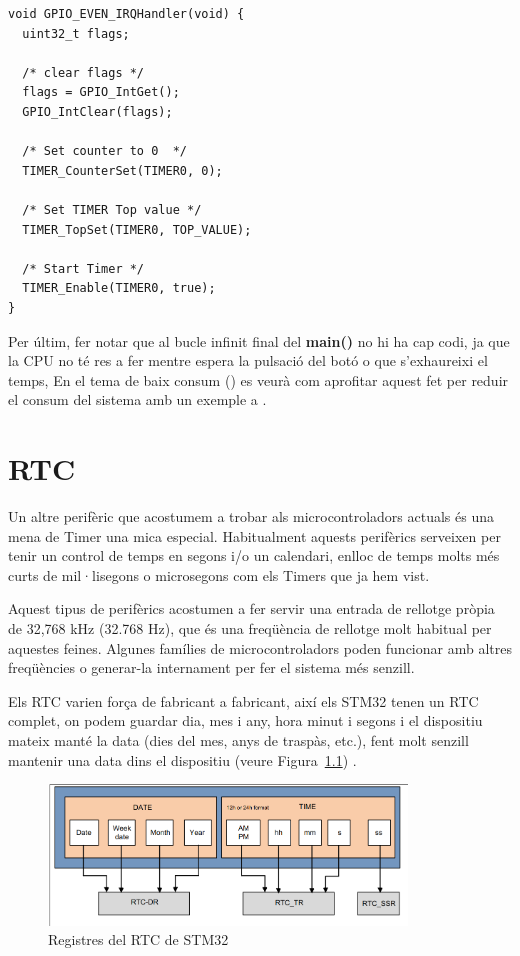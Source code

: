 \begin{lstlisting}[style=customc, label=GPIO_ISR_Timer, caption=ISR del GPIO per l'exemple del Timer]
void GPIO_EVEN_IRQHandler(void) {
  uint32_t flags;

  /* clear flags */
  flags = GPIO_IntGet();
  GPIO_IntClear(flags);

  /* Set counter to 0  */
  TIMER_CounterSet(TIMER0, 0);

  /* Set TIMER Top value */
  TIMER_TopSet(TIMER0, TOP_VALUE);

  /* Start Timer */
  TIMER_Enable(TIMER0, true);
}
\end{lstlisting}

Per últim, fer notar que al bucle infinit final del {\bf main()} no hi ha cap codi, ja que la \gls{CPU} no té res a fer mentre espera la pulsació del botó o que s'exhaureixi el temps, En el tema de baix consum () es veurà com aprofitar aquest fet per reduir el consum del sistema amb un exemple a .

\chapter{RTC}
\label{sub:RTC}

Un altre perifèric que acostumem a trobar als microcontroladors actuals és una mena de \gls{Timer} una mica especial. Habitualment aquests perifèrics serveixen per tenir un control de temps en segons i/o un calendari, enlloc de temps molts més curts de mil·lisegons o microsegons com els Timers que ja hem vist.

Aquest tipus de perifèrics acostumen a fer servir una entrada de rellotge pròpia de 32,768 kHz (32.768 Hz), que és una freqüència de rellotge molt habitual per aquestes feines. Algunes famílies de microcontroladors poden funcionar amb altres freqüències o generar-la internament per fer el sistema més senzill.

Els RTC varien força de fabricant a fabricant, així els STM32 tenen un RTC complet, on podem guardar dia, mes i any, hora minut i segons i el dispositiu mateix manté la data (dies del mes, anys de traspàs, etc.), fent molt senzill mantenir una data dins el dispositiu (veure Figura~\ref{fig:STRTC}) \cite[799]{STM32F4RM}.

\begin{figure}
 \centering
 \includegraphics[width=0.85\textwidth, keepaspectratio]{imatges/RTC_STM32.png}
 \caption{Registres del RTC de STM32 \cite{ST_AN3371}}
 \label{fig:STRTC}
\end{figure}

